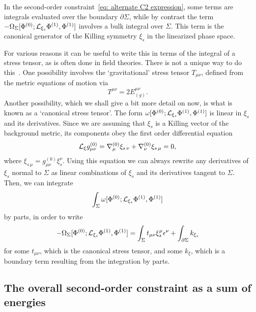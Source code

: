 \documentclass[]{jkpaper}
\theoremstyle{plain}
\theoremstyle{definition}
\begin{document}
In the second-order constraint~\eqref{eq: alternate C2 expression}, some terms are integrals evaluated over the boundary $\partial\Sigma$, while by contrast the term $-\Omega_\Sigma[\Phi^{(0)};\mathcal{L}_{\xi_s}\Phi^{(1)},\Phi^{(1)}]$ involves a bulk integral over $\Sigma$. This term is the canonical generator of the Killing symmetry $\xi_s$ in the linearized phase space.

For various reasons it can be useful to write this in terms of the integral of a stress tensor, as is often done in field theories. There is not a unique way to do this~\cite{Iyer:1994ys,Fursaev:1998hr}. One possibility involves the `gravitational' stress tensor $T_{\mu\nu}$, defined from the metric equations of motion via
\begin{equation}
    T^{\mu\nu} = 2E^{\mu\nu}_{(g)}.
\end{equation}
Another possibility, which we shall give a bit more detail on now, is what is known as a `canonical stress tensor'. The form $\omega[\Phi^{(0)};\mathcal{L}_{\xi_s}\Phi^{(1)},\Phi^{(1)}]$ is linear in $\xi_s$ and its derivatives. Since we are assuming that $\xi_s$ is a Killing vector of the background metric, its components obey the first order differential equation
\begin{equation}
    \mathcal{L}_\xi g^{(0)}_{\mu \nu} = \nabla^{(0)}_\mu\xi_{s\,\nu} + \nabla^{(0)}_\nu\xi_{s\,\mu} = 0,
\end{equation}
where $\xi_{s\,\mu} = g_{\mu \nu}^{(0)}\xi_s^\nu$. Using this equation we can always rewrite any derivatives of $\xi_s$ normal to $\Sigma$ as linear combinations of $\xi_s$ and its derivatives tangent to $\Sigma$. Then, we can integrate 
\begin{equation}
    \int_\Sigma\omega[\Phi^{(0)};\mathcal{L}_{\xi_s}\Phi^{(1)},\Phi^{(1)}]
\end{equation}
by parts, in order to write 
\begin{equation}
    -\Omega_\Sigma[\Phi^{(0)};\mathcal{L}_{\xi_s}\Phi^{(1)},\Phi^{(1)}] = \int_{\Sigma} t_{\mu\nu}\xi_s^\mu \epsilon^\nu + \int_{\partial\Sigma} k_{\xi_s}
\end{equation}
for some $t_{\mu\nu}$, which is the canonical stress tensor, and some $k_\xi$, which is a boundary term resulting from the integration by parts. 


\subsection{The overall second-order constraint as a sum of energies}\label{ssec_overall2ndorder}
\end{document}
